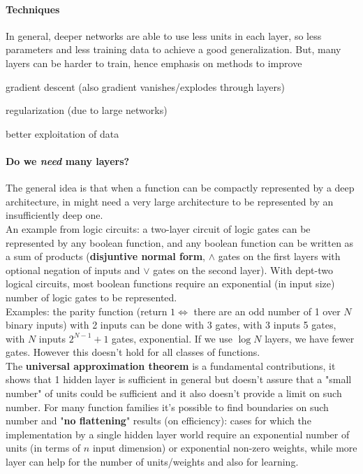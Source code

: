\documentclass[10pt]{report}
\begin{document}
\paragraph{Techniques} In general, deeper networks are able to use less units in each layer, so less parameters and less training data to achieve a good generalization. But, many layers can be harder to train, hence emphasis on methods to improve
\begin{list}{}{}
	\item gradient descent (also gradient vanishes/explodes through layers)
	\item regularization (due to large networks)
	\item better exploitation of data
\end{list}
\paragraph{Do we \textit{need} many layers?} The general idea is that when a function can be compactly represented by a deep architecture, in might need a very large architecture to be represented by an insufficiently deep one.\\
An example from logic circuits: a two-layer circuit of logic gates can be represented by any boolean function, and any boolean function can be written as a sum of products (\textbf{disjuntive normal form}, $\wedge$ gates on the first layers with optional negation of inputs and $\vee$ gates on the second layer). With dept-two logical circuits, most boolean functions require an exponential (in input size) number of logic gates to be represented.\\
Examples: the parity function (return $1\Leftrightarrow$ there are an odd number of 1 over $N$ binary inputs) with 2 inputs can be done with 3 gates, with 3 inputs 5 gates, with $N$ inputs $2^{N-1}+1$ gates, exponential. If we use $\log N$ layers, we have fewer gates. However this doesn't hold for all classes of functions.\\
The \textbf{universal approximation theorem} is a fundamental contributions, it shows that 1 hidden layer is sufficient in general but doesn't assure that a "small number" of units could be sufficient and it also doesn't provide a limit on such number. For many function families it's possible to find boundaries on such number and "\textbf{no flattening}" results (on efficiency): cases for which the implementation by a single hidden layer world require an exponential number of units (in terms of $n$ input dimension) or exponential non-zero weights, while more layer can help for the number of units/weights and also for learning.
\end{document}

